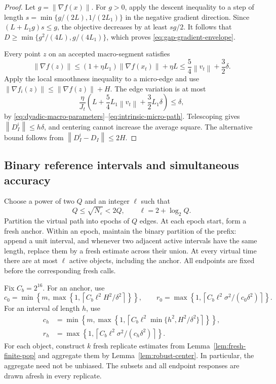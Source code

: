 \documentclass[11pt,a4paper]{article}
\newcommand{\eps}{\varepsilon}
\newcommand{\norm}[1]{\left\lVert #1\right\rVert}
\theoremstyle{remark}
\begin{document}
\begin{proof}
Let $g=\norm{\nabla f(x)}$.  For $g>0$, apply the descent inequality to a
step of length $s=\min\{g/(2L),1/(2L_1)\}$ in the negative gradient
direction.  Since $(L+L_1g)s\le g$, the objective decreases by at least
$sg/2$.  It follows that
$D\ge\min\{g^2/(4L),g/(4L_1)\}$, which proves
\eqref{eq:gap-gradient-envelope}.

Every point $z$ on an accepted macro-segment satisfies
\[
 \norm{\nabla f(z)}
 \le(1+\eta L_1)\norm{\nabla f(x_t)}+\eta L
 \le\frac54\norm{v_t}+\frac32\delta.
\]
Apply the local smoothness inequality to a micro-edge and use
$\norm{\nabla f_i(z)}\le\norm{\nabla f(z)}+H$.  The edge variation is at most
\[
 \frac{\eta}{J_t}
 \left(L+\frac54L_1\norm{v_t}+\frac32L_1\delta\right)
 \le\delta,
\]
by \eqref{eq:dyadic-macro-parameters}--\eqref{eq:intrinsic-micro-path}.
Telescoping gives $\norm{D^i_I}\le h\delta$, and centering cannot increase
the average square.  The alternative bound follows from
$\norm{D^i_I-D_I}\le2H$.
\end{proof}

\subsection{Binary reference intervals and simultaneous accuracy}

Choose a power of two $Q$ and an integer $\ell$ such that
\begin{equation}
 Q\le\sqrt{N_\eps}<2Q,\qquad \ell=2+\log_2Q.
 \label{eq:dyadic-Q}
\end{equation}
Partition the virtual path into epochs of $Q$ edges.  At each epoch start,
form a fresh anchor.  Within an epoch, maintain the binary partition of the
prefix: append a unit interval, and whenever two adjacent active intervals
have the same length, replace them by a fresh estimate across their union.
At every virtual time there are at most $\ell$ active objects, including the
anchor.  All endpoints are fixed before the corresponding fresh calls.

Fix $C_b=2^{16}$.  For an anchor, use
\begin{equation}
 c_0=\min\left\{m,\max\left\{1,
       \left\lceil C_b\ell^2H^2/\delta^2\right\rceil\right\}\right\},
 \qquad
 r_0=\max\left\{1,
       \left\lceil C_b\ell^2\sigma^2/(c_0\delta^2)\right\rceil\right\}.
 \label{eq:dyadic-anchor-batches}
\end{equation}
For an interval of length $h$, use
\begin{equation}
 \begin{split}
 c_h&=\min\left\{m,\max\left\{1,
       \left\lceil C_b\ell^2\min\{h^2,H^2/\delta^2\}\right\rceil
                              \right\}\right\},\\
 r_h&=\max\left\{1,
       \left\lceil C_b\ell^2\sigma^2/(c_h\delta^2)\right\rceil\right\}.
 \end{split}
 \label{eq:dyadic-block-batches}
\end{equation}
For each object, construct $k$ fresh replicate estimates from
Lemma~\ref{lem:fresh-finite-pop} and aggregate them by
Lemma~\ref{lem:robust-center}.  In particular, the aggregate need not be
unbiased.  The subsets and all endpoint responses are drawn afresh in every
replicate.
\end{document}
